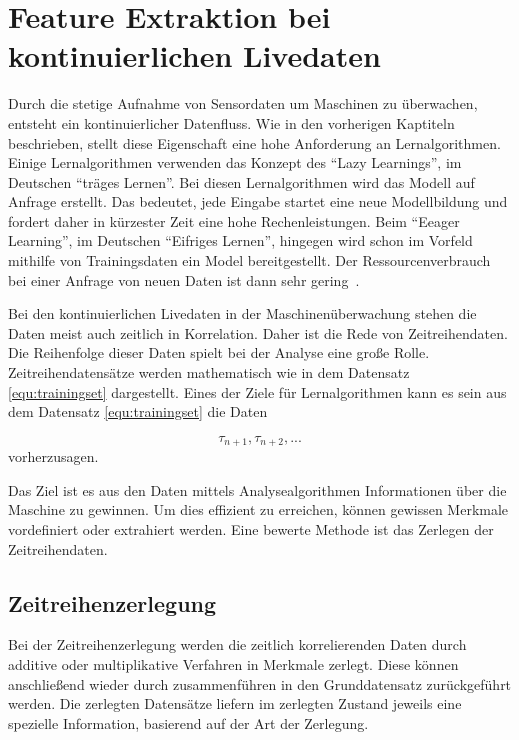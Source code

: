 \section{Feature Extraktion bei kontinuierlichen Livedaten}\label{kap:featureextraktion}

Durch die stetige Aufnahme von Sensordaten um Maschinen zu überwachen, entsteht ein kontinuierlicher Datenfluss. 
Wie in den vorherigen Kaptiteln beschrieben, stellt diese Eigenschaft eine hohe Anforderung an Lernalgorithmen. 
Einige Lernalgorithmen verwenden das Konzept des \enquote{Lazy Learnings}, im Deutschen \enquote{träges Lernen}. 
Bei diesen Lernalgorithmen wird das Modell auf Anfrage erstellt. 
Das bedeutet, jede Eingabe startet eine neue Modellbildung und fordert daher in kürzester Zeit eine hohe Rechenleistungen. Beim \enquote{Eeager Learning}, im Deutschen \enquote{Eifriges Lernen}, hingegen wird schon im Vorfeld mithilfe von Trainingsdaten ein Model bereitgestellt. 
Der Ressourcenverbrauch bei einer Anfrage von neuen Daten ist dann sehr gering~\cite{Gay2013}. 

Bei den kontinuierlichen Livedaten in der Maschinenüberwachung stehen die Daten meist auch zeitlich in Korrelation. Daher ist die Rede von Zeitreihendaten. Die Reihenfolge dieser Daten spielt bei der Analyse eine große Rolle. Zeitreihendatensätze werden mathematisch wie in dem Datensatz \ref{equ:trainingset} dargestellt. Eines der Ziele für Lernalgorithmen kann es sein aus dem Datensatz \ref{equ:trainingset} die Daten 

\begin{equation}
  \tau_{n+1}, \tau_{n+2}, ...
  \label{equ:predictionset}
\end{equation}
vorherzusagen.

Das Ziel ist es aus den Daten mittels Analysealgorithmen Informationen über die Maschine zu gewinnen. 
Um dies effizient zu erreichen, können gewissen Merkmale vordefiniert oder extrahiert werden. 
Eine bewerte Methode ist das Zerlegen der Zeitreihendaten.

\subsection{Zeitreihenzerlegung}
Bei der Zeitreihenzerlegung werden die zeitlich korrelierenden Daten durch additive oder multiplikative Verfahren in Merkmale zerlegt. 
Diese können anschließend wieder durch zusammenführen in den Grunddatensatz zurückgeführt werden.
Die zerlegten Datensätze liefern im zerlegten Zustand jeweils eine spezielle Information, basierend auf der Art der Zerlegung.

